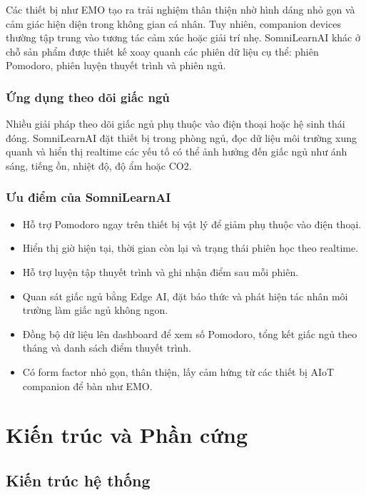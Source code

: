 \documentclass[12pt,a4paper]{article}
\begin{document}
Các thiết bị như EMO tạo ra trải nghiệm thân thiện nhờ hình dáng nhỏ gọn và cảm giác hiện diện trong không gian cá nhân. Tuy nhiên, companion devices thường tập trung vào tương tác cảm xúc hoặc giải trí nhẹ. SomniLearnAI khác ở chỗ sản phẩm được thiết kế xoay quanh các phiên dữ liệu cụ thể: phiên Pomodoro, phiên luyện thuyết trình và phiên ngủ.

\subsubsection{Ứng dụng theo dõi giấc ngủ}

Nhiều giải pháp theo dõi giấc ngủ phụ thuộc vào điện thoại hoặc hệ sinh thái đóng. SomniLearnAI đặt thiết bị trong phòng ngủ, đọc dữ liệu môi trường xung quanh và hiển thị realtime các yếu tố có thể ảnh hưởng đến giấc ngủ như ánh sáng, tiếng ồn, nhiệt độ, độ ẩm hoặc CO2.

\subsubsection{Ưu điểm của SomniLearnAI}

\begin{itemize}
    \item Hỗ trợ Pomodoro ngay trên thiết bị vật lý để giảm phụ thuộc vào điện thoại.
    \item Hiển thị giờ hiện tại, thời gian còn lại và trạng thái phiên học theo realtime.
    \item Hỗ trợ luyện tập thuyết trình và ghi nhận điểm sau mỗi phiên.
    \item Quan sát giấc ngủ bằng Edge AI, đặt báo thức và phát hiện tác nhân môi trường làm giấc ngủ không ngon.
    \item Đồng bộ dữ liệu lên dashboard để xem số Pomodoro, tổng kết giấc ngủ theo tháng và danh sách điểm thuyết trình.
    \item Có form factor nhỏ gọn, thân thiện, lấy cảm hứng từ các thiết bị AIoT companion để bàn như EMO.
\end{itemize}

\newpage
\section{Kiến trúc và Phần cứng}

\subsection{Kiến trúc hệ thống}
\end{document}
